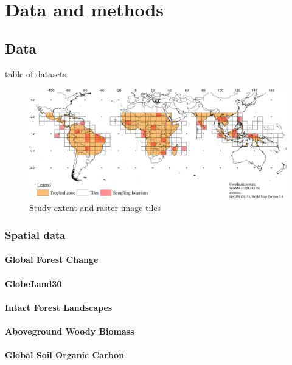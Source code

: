 \section{Data and methods}
\label{sec:datamethods}

\subsection{Data}
\label{subsec:data}

	{\color{red} table of datasets} 

	\begin{figure}[ht]
		\centering
		\includegraphics[scale=.97]{img/method_overview_frameless}
		\caption[Study extent]{Study extent and raster image tiles}
		\label{fig:studyextent}
	\end{figure}

	\subsubsection{Spatial data}
		\paragraph{Global Forest Change}
		\paragraph{GlobeLand30}
		\paragraph{Intact Forest Landscapes}
		\paragraph{Aboveground Woody Biomass}
		\paragraph{Global Soil Organic Carbon}
